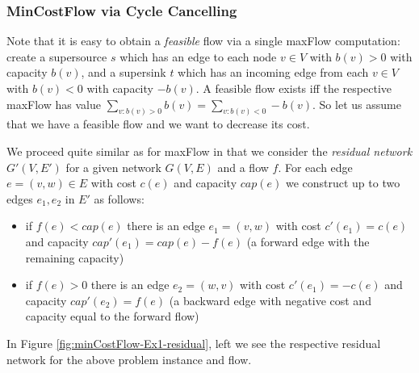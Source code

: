 \documentclass{article}
\begin{document}
\subsubsection{MinCostFlow via Cycle Cancelling}
Note that it is easy to obtain a \emph{feasible} flow  via a single maxFlow computation: create a supersource $s$ which has an edge to each node $v\in V$ with $b(v)>0$ with capacity $b(v)$, and a supersink $t$ which has an incoming edge from each $v\in V$ with $b(v)<0$ with capacity $-b(v)$. A feasible flow exists iff the respective maxFlow has value $\sum_{v:b(v)>0} b(v)=\sum_{v:b(v)<0}-b(v)$.
So let us assume that we have a feasible flow and we want to decrease its cost.

We proceed quite similar as for maxFlow in that we consider the \emph{residual network} $G'(V,E')$ for a given network $G(V,E)$ and a flow $f$. For each edge $e=(v,w)\in E$ with cost $c(e)$ and capacity $cap(e)$ we construct up to two edges $e_1, e_2$ in $E'$ as follows:
\begin{itemize}
\item if $f(e)<cap(e)$ there is an edge $e_1=(v,w)$ with cost $c'(e_1)=c(e)$ and capacity $cap'(e_1)=cap(e)-f(e)$
	(a forward edge with the remaining capacity)
\item if $f(e)>0$ there is an edge $e_2=(w,v)$ with cost $c'(e_1)=-c(e)$ and capacity $cap'(e_2)=f(e)$ (a backward edge with negative cost and capacity equal to the forward flow)
\end{itemize}

In Figure \ref{fig:minCostFlow-Ex1-residual}, left we see the respective residual network for the above problem instance and flow. 
\end{document}

